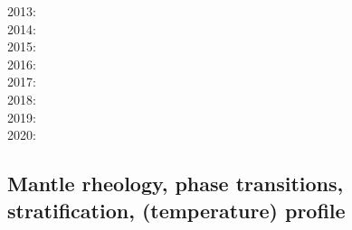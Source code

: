 {2013: \cite{holj13}\cite{dadb13}\cite{toyd13}\cite{bogs13a}\cite{busa13}\cite{mika13}
      \cite{fabc13}\cite{cosr13}\cite{coml13}\cite{cost13}\cite{stha13}\cite{plth13}\cite{oflb13}\\
2014: \cite{arfw14}\cite{helo14}\cite{crta14}\cite{flgw14}\cite{roct14}\cite{cort14}\cite{becr14}
      \cite{nata14}\cite{stha14}\cite{stlh14}\cite{ogaw14}\\
2015: \cite{thkp15}\cite{wegg15}\cite{bect15}\cite{pesw15}\\
2016: \cite{frbs16}\cite{sisc16}\cite{boba16}\cite{wele16}\cite{welm16}\cite{vade16}\cite{chah16}\\
2017: \cite{ghts17}\cite{civj17}\\
2018: \cite{cold18}\cite{arcf18}\cite{cosh18}\cite{wele18}\\
2019: \cite{gult19}\cite{mazh19}\cite{cohf19}\cite{lewh19}\cite{ulcw19}\cite{boba19}\cite{fube19}
      \cite{plju19}\\
2020: \cite{lalt20}\cite{gugb20}\cite{yabt20}
}

\subsection{Mantle rheology, phase transitions, stratification, (temperature) profile}


